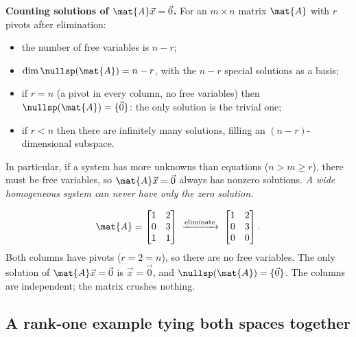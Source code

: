 \begin{formalbox}
\textbf{Counting solutions of $\mat{A}\vec{x}=\vec{0}$.} For an $m\times n$ matrix
$\mat{A}$ with $r$ pivots after elimination:
\begin{itemize}
  \item the number of free variables is $n - r$;
  \item $\dim\nullsp(\mat{A}) = n - r$, with the $n-r$ special solutions as a
  basis;
  \item if $r = n$ (a pivot in every column, no free variables) then
  $\nullsp(\mat{A}) = \{\vec{0}\}$: the only solution is the trivial one;
  \item if $r < n$ then there are infinitely many solutions, filling an
  $(n-r)$-dimensional subspace.
\end{itemize}
In particular, if a system has more unknowns than equations ($n > m \ge r$),
there must be free variables, so $\mat{A}\vec{x}=\vec{0}$ always has nonzero
solutions. \emph{A wide homogeneous system can never have only the zero
solution.}
\end{formalbox}

\begin{example}\label{ch12:trivial-null}
\[
  \mat{A} = \begin{bmatrix} 1 & 2 \\ 0 & 3 \\ 1 & 1 \end{bmatrix}
  \;\xrightarrow{\text{eliminate}}\;
  \begin{bmatrix} 1 & 2 \\ 0 & 3 \\ 0 & 0 \end{bmatrix}.
\]
Both columns have pivots ($r=2=n$), so there are no free variables. The only
solution of $\mat{A}\vec{x}=\vec{0}$ is $\vec{x}=\vec{0}$, and
$\nullsp(\mat{A})=\{\vec 0\}$. The columns are independent; the matrix crushes
nothing.
\end{example}

\subsection{A rank-one example tying both spaces together}

